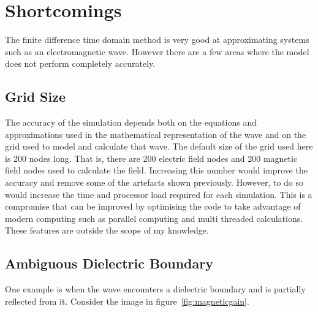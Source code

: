 
\section{Shortcomings} %
\label{sec:shortcomings}
The finite difference time domain method is very good at approximating systems such as an electromagnetic wave. However there are a few areas where the model does not perform completely accurately. 

\subsection{Grid Size} %
\label{sub:grid_size}
The accuracy of the simulation depends both on the equations and approximations used in the mathematical representation of the wave and on the grid used to model and calculate that wave. The default size of the grid used here is 200 nodes long. That is, there are 200 electric field nodes and 200 magnetic field nodes used to calculate the field. Increasing this number would improve the accuracy and remove some of the artefacts shown previously. However, to do so would increase the time and processor load required for each simulation. This is a compromise that can be improved by optimising the code to take advantage of modern computing such as parallel computing and multi threaded calculations. These features are outside the scope of my knowledge.

\subsection{Ambiguous Dielectric Boundary} %
\label{sub:ambiguous_dielectric_boundary}

One example is when the wave encounters a dielectric boundary and is partially reflected from it. Consider the image in figure~\ref{fig:magneticgain}.

